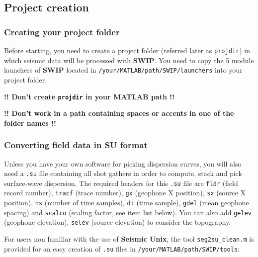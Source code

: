 \documentclass[twoside,a4paper]{article}
\def\SWIP{\textbf{SWIP}}
\def\SeismicUnix{\textbf{Seismic Unix}}
\def\MATLAB{\textbf{MATLAB}}
\begin{document}
\subsection{Project creation}
\subsubsection{Creating your project folder}
Before starting, you need to create a project folder (referred later as \verb|projdir|) in which seismic data will be processed with {\SWIP}. You need to copy the 5 module launchers of {\SWIP} located in \verb|/your/MATLAB/path/SWIP/launchers| into your project folder.

\textbf{!! Don't create \verb|projdir| in your {\MATLAB} path !!}

\textbf{!! Don't work in a path containing spaces or accents in one of the folder names !!}

\subsubsection{Converting field data in SU format}
\label{sec:seg2su}
Unless you have your own software for picking dispersion curves, you will also need a \verb|.su| file containing all shot gathers in order to compute, stack and pick surface-wave dispersion. The required headers for this \verb|.su| file are \verb|fldr| (field record number), \verb|tracf| (trace number), \verb|gx| (geophone X position), \verb|sx| (source X position), \verb|ns| (number of time samples), \verb|dt| (time sample), \verb|gdel| (mean geophone spacing) and \verb|scalco| (scaling factor, see item list below). You can also add \verb|gelev| (geophone elevation), \verb|selev| (source elevation) to consider the topography. 

For users non familiar with the use of {\SeismicUnix}, the tool \verb|seg2su_clean.m| is provided for an easy creation of \verb|.su| files in \verb|/your/MATLAB/path/SWIP/tools|:
\end{document}
